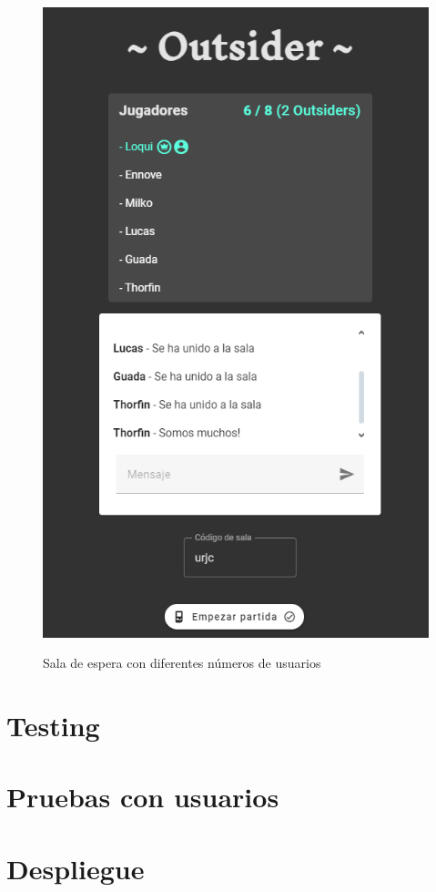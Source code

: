 \begin{figure}[h]
\begin{minipage}{0.45\textwidth}
	  \includegraphics[clip=true,width=\textwidth]{res_lobby1.png}\\
   \end{minipage}
   \caption{Sala de espera con diferentes números de usuarios}
   \label{fig:res_lobby}
 \end{figure}

\section{Testing}

\section{Pruebas con usuarios}

\section{Despliegue}






